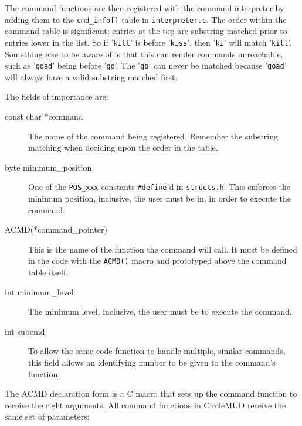 \documentclass[11pt]{article}
\begin{document}
The command functions are then registered with the command interpreter by adding them to the \texttt{cmd\_info[]} table in \texttt{interpreter.c}.  The order within the command table is significant; entries at the top are substring matched prior to entries lower in the list.  So if '\texttt{kill}' is before '\texttt{kiss}', then '\texttt{ki}' will match '\texttt{kill}'.  Something else to be aware of is that this can render commands unreachable, such as '\texttt{goad}' being before '\texttt{go}'.  The '\texttt{go}' can never be matched because '\texttt{goad}' will always have a valid substring matched first.
\par
The fields of importance are:
\begin{description}
\item[const char *command]
The name of the command being registered.  Remember the substring matching when deciding upon the order in the table.
\item[byte minimum\_position]
One of the \texttt{POS\_xxx} constants \texttt{\#define}'d in \texttt{structs.h}.  This enforces the minimum position, inclusive, the user must be in, in order to execute the command.
\item[ACMD(*command\_pointer)]
This is the name of the function the command will call.  It must be defined in the code with the \texttt{ACMD()} macro and prototyped above the command table itself.
\item[int minimum\_level]
The minimum level, inclusive, the user must be to execute the command.
\item[int subcmd]
To allow the same code function to handle multiple, similar commands, this field allows an identifying number to be given to the command's function.
\end{description}
The ACMD declaration form is a C macro that sets up the command function to receive the right arguments.  All command functions in CircleMUD receive the same set of parameters:
\end{document}
